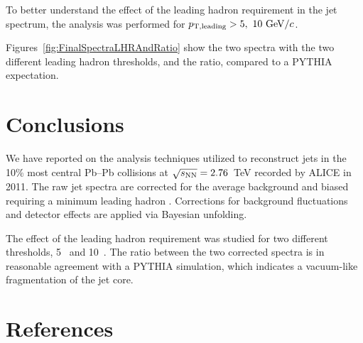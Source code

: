 \documentclass[a4paper]{jpconf}
\begin{document}
To better understand the effect of the leading hadron requirement
in the jet \pT{} spectrum, the analysis was performed for $p_{\rm T, leading} > 5,~10~\mathrm{GeV}/c$.

Figures~\ref{fig:FinalSpectraLHRAndRatio} show the two spectra with the two different leading hadron thresholds,
and the ratio, compared to a PYTHIA expectation. 

\section{Conclusions}
We have reported on the analysis techniques utilized to reconstruct jets in the 10\% most central Pb--Pb 
collisions at $\sqrt{s_{\rm NN}}=2.76$~TeV recorded by ALICE in 2011. The raw jet \pT{} spectra are corrected for the average
background and biased requiring a minimum leading hadron \pT{}. Corrections
for background fluctuations and detector effects are applied via Bayesian unfolding.

The effect of the leading hadron requirement was studied for two different thresholds, 5~\gevc{} and 10~\gevc{}.
The ratio between the two corrected spectra is in reasonable agreement with a PYTHIA simulation, 
which indicates a vacuum-like fragmentation of the jet core.

\section*{References}

\end{document}
